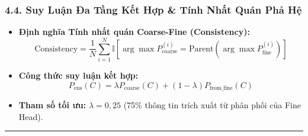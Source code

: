 \documentclass[
  11pt,
  a4paper,
]{article}
\providecommand{\tightlist}{%
  \setlength{\itemsep}{0pt}\setlength{\parskip}{0pt}}
\begin{document}
\subsubsection{4.4. Suy Luận Đa Tầng Kết Hợp \& Tính Nhất Quán Phả
Hệ}\label{suy-luux1eadn-ux111a-tux1ea7ng-kux1ebft-hux1ee3p-tuxednh-nhux1ea5t-quuxe1n-phux1ea3-hux1ec7}

\begin{itemize}
\tightlist
\item
  \textbf{Định nghĩa Tính nhất quán Coarse-Fine (Consistency):}
  \[\text{Consistency} = \frac{1}{N}\sum_{i=1}^N \mathbb{I}\left[\arg\max P_{\text{coarse}}^{(i)} = \text{Parent}\left(\arg\max P_{\text{fine}}^{(i)}\right)\right]\]
\item
  \textbf{Công thức suy luận kết hợp:}
  \[P_{\text{ens}}(C) = \lambda P_{\text{coarse}}(C) + (1-\lambda) P_{\text{from\_fine}}(C)\]
\item
  \textbf{Tham số tối ưu:} \(\lambda = 0{,}25\) (75\% thông tin trích
  xuất từ phân phối của Fine Head).
\end{itemize}

\begin{center}\rule{0.5\linewidth}{0.5pt}\end{center}
\end{document}

